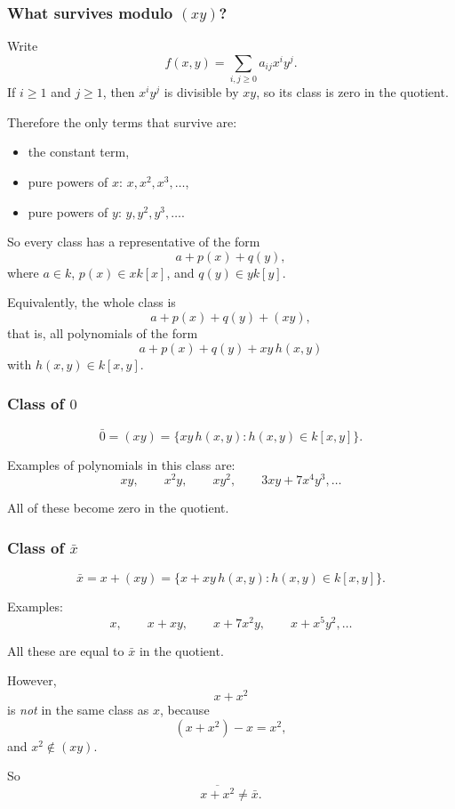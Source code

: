 \documentclass[12pt,a4paper,oneside]{report}
\theoremstyle{notespace}
\begin{document}
	\subsubsection{What survives modulo \((xy)\)?}
	
	Write
	\[
	f(x,y)=\sum_{i,j\ge 0} a_{ij}x^iy^j.
	\]
	If \(i\ge 1\) and \(j\ge 1\), then \(x^iy^j\) is divisible by \(xy\), so its class is zero in the quotient.
	
	Therefore the only terms that survive are:
	\begin{itemize}
		\item the constant term,
		\item pure powers of \(x\): \(x,x^2,x^3,\dots\),
		\item pure powers of \(y\): \(y,y^2,y^3,\dots\).
	\end{itemize}
	
	So every class has a representative of the form
	\[
	a+p(x)+q(y),
	\]
	where \(a\in k\), \(p(x)\in xk[x]\), and \(q(y)\in yk[y]\).
	
	Equivalently, the whole class is
	\[
	a+p(x)+q(y)+(xy),
	\]
	that is, all polynomials of the form
	\[
	a+p(x)+q(y)+xy\,h(x,y)
	\]
	with \(h(x,y)\in k[x,y]\).
	
	\subsubsection{Class of \(0\)}
	
	\[
	\bar 0=(xy)=\{xy\,h(x,y):h(x,y)\in k[x,y]\}.
	\]
	
	Examples of polynomials in this class are:
	\[
	xy,\qquad x^2y,\qquad xy^2,\qquad 3xy+7x^4y^3,\dots
	\]
	
	All of these become zero in the quotient.
	
	\subsubsection{Class of \(\bar x\)}
	
	\[
	\bar x=x+(xy)=\{x+xy\,h(x,y):h(x,y)\in k[x,y]\}.
	\]
	
	Examples:
	\[
	x,\qquad x+xy,\qquad x+7x^2y,\qquad x+x^5y^2,\dots
	\]
	
	All these are equal to \(\bar x\) in the quotient.
	
	However,
	\[
	x+x^2
	\]
	is \emph{not} in the same class as \(x\), because
	\[
	(x+x^2)-x=x^2,
	\]
	and \(x^2\notin (xy)\).
	
	So
	\[
	\overline{x+x^2}\neq \bar x.
	\]
	
\end{document}
